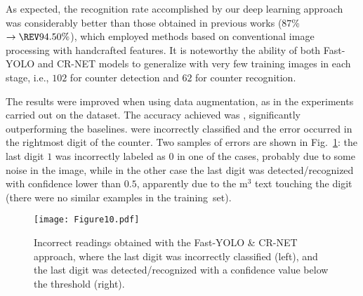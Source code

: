 As expected, the recognition rate accomplished by our deep learning approach
was considerably better than those obtained in previous works ($87$\% $\rightarrow \REV{94.50\%}$), which employed methods based on conventional image processing with handcrafted features. It is noteworthy the ability of both Fast-YOLO and CR-NET models to generalize with very few training images in each stage, i.e., $102$ for counter detection and $62$ for counter recognition. 
 
The results were improved when using data augmentation, as in the experiments carried out on the \dataset dataset.
The accuracy achieved was , significantly outperforming the baselines.
 were incorrectly classified and  the error occurred in the rightmost digit of the counter. 
Two samples of errors are shown in Fig.~\ref{fig:result_meter_integration}: the last digit $1$ was incorrectly labeled as $0$ in one of the cases, probably due to some noise in the image, while in the other case the last digit was detected/recognized with confidence lower than $0.5$, apparently due to the m$^3$ text touching the digit (there were no similar examples in the training~set). 

\begin{figure}[!htb]
	\begin{center}
	\texttt{[image: Figure10.pdf]}
    \end{center}
    \vspace{-1mm}
    \caption{Incorrect readings obtained with the Fast-YOLO \& CR-NET approach, where the last digit was incorrectly classified (left), and the last digit was detected/recognized with a confidence value below the threshold (right).}
	\label{fig:result_meter_integration}  
\end{figure}